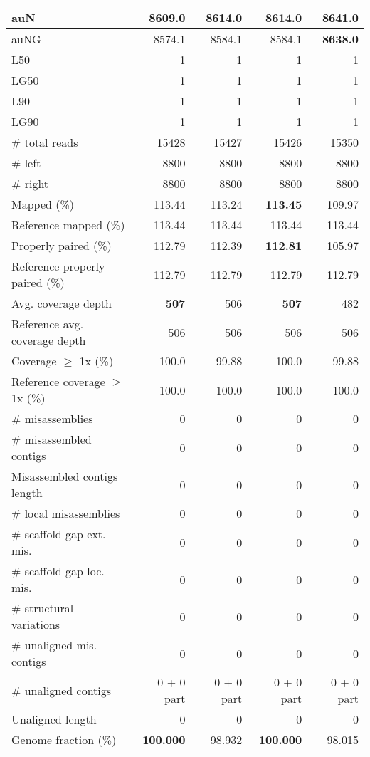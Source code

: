 \documentclass[12pt,a4paper]{article}
\begin{document}
\begin{table}[ht]
\begin{center}
\begin{tabular}{|l*{4}{|r}|}
auN & 8609.0 & 8614.0 & 8614.0 & {\bf 8641.0} \\ \hline
auNG & 8574.1 & 8584.1 & 8584.1 & {\bf 8638.0} \\ \hline
L50 & 1 & 1 & 1 & 1 \\ \hline
LG50 & 1 & 1 & 1 & 1 \\ \hline
L90 & 1 & 1 & 1 & 1 \\ \hline
LG90 & 1 & 1 & 1 & 1 \\ \hline
\# total reads & 15428 & 15427 & 15426 & 15350 \\ \hline
\# left & 8800 & 8800 & 8800 & 8800 \\ \hline
\# right & 8800 & 8800 & 8800 & 8800 \\ \hline
Mapped (\%) & 113.44 & 113.24 & {\bf 113.45} & 109.97 \\ \hline
Reference mapped (\%) & 113.44 & 113.44 & 113.44 & 113.44 \\ \hline
Properly paired (\%) & 112.79 & 112.39 & {\bf 112.81} & 105.97 \\ \hline
Reference properly paired (\%) & 112.79 & 112.79 & 112.79 & 112.79 \\ \hline
Avg. coverage depth & {\bf 507} & 506 & {\bf 507} & 482 \\ \hline
Reference avg. coverage depth & 506 & 506 & 506 & 506 \\ \hline
Coverage $\geq$ 1x (\%) & 100.0 & 99.88 & 100.0 & 99.88 \\ \hline
Reference coverage $\geq$ 1x (\%) & 100.0 & 100.0 & 100.0 & 100.0 \\ \hline
\# misassemblies & 0 & 0 & 0 & 0 \\ \hline
\# misassembled contigs & 0 & 0 & 0 & 0 \\ \hline
Misassembled contigs length & 0 & 0 & 0 & 0 \\ \hline
\# local misassemblies & 0 & 0 & 0 & 0 \\ \hline
\# scaffold gap ext. mis. & 0 & 0 & 0 & 0 \\ \hline
\# scaffold gap loc. mis. & 0 & 0 & 0 & 0 \\ \hline
\# structural variations & 0 & 0 & 0 & 0 \\ \hline
\# unaligned mis. contigs & 0 & 0 & 0 & 0 \\ \hline
\# unaligned contigs & 0 + 0 part & 0 + 0 part & 0 + 0 part & 0 + 0 part \\ \hline
Unaligned length & 0 & 0 & 0 & 0 \\ \hline
Genome fraction (\%) & {\bf 100.000} & 98.932 & {\bf 100.000} & 98.015 \\ \hline

\end{tabular}
\end{center}
\end{table}
\end{document}
